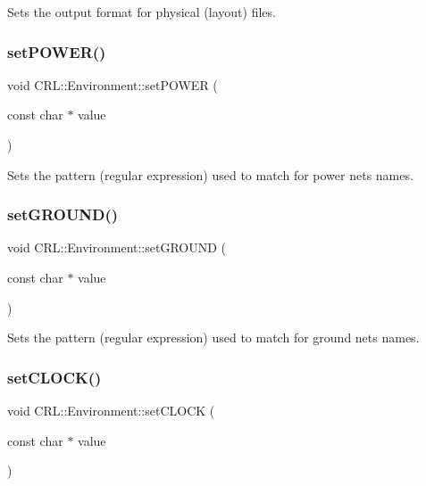 Sets the output format for physical (layout) files. \mbox{\label{classCRL_1_1Environment_ae96c850eadc89d1705b9aa0256f434ea}} 
\subsubsection{\texorpdfstring{set\+P\+O\+W\+E\+R()}{setPOWER()}}
{\footnotesize\ttfamily void C\+R\+L\+::\+Environment\+::set\+P\+O\+W\+ER (\begin{DoxyParamCaption}\item[{const char $\ast$}]{value }\end{DoxyParamCaption})}

Sets the pattern (regular expression) used to match for power nets names. \mbox{\label{classCRL_1_1Environment_ac956b6814f89975563a3667945599fb2}} 
\subsubsection{\texorpdfstring{set\+G\+R\+O\+U\+N\+D()}{setGROUND()}}
{\footnotesize\ttfamily void C\+R\+L\+::\+Environment\+::set\+G\+R\+O\+U\+ND (\begin{DoxyParamCaption}\item[{const char $\ast$}]{value }\end{DoxyParamCaption})}

Sets the pattern (regular expression) used to match for ground nets names. \mbox{\label{classCRL_1_1Environment_a7ddc44d7f27745179c397445bce35c58}} 
\subsubsection{\texorpdfstring{set\+C\+L\+O\+C\+K()}{setCLOCK()}}
{\footnotesize\ttfamily void C\+R\+L\+::\+Environment\+::set\+C\+L\+O\+CK (\begin{DoxyParamCaption}\item[{const char $\ast$}]{value }\end{DoxyParamCaption})}

